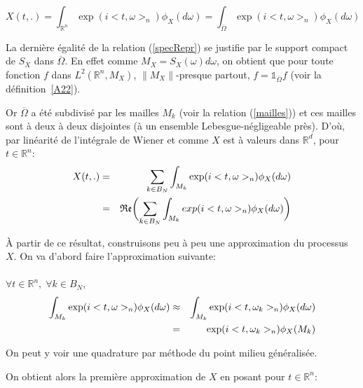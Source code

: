 \begin{equation}
X(t,.) = \displaystyle\int_{\mathbb{R}^n} \exp(i<t,\omega>_{n}) \phi_X(d\omega)= \displaystyle\int_{\overline{\Omega}} \exp(i<t,\omega>_{n}) \phi_X(d\omega) \label{specRepr}
\end{equation}

\begin{remark}
  La dernière égalité de la relation (\ref{specRepr}) se justifie par le support compact de $S_X$ dans $\overline{\Omega}$. En effet comme $M_X = S_X(\omega)d\omega$, on obtient que pour toute fonction $f$ dans $L^2(\mathbb{R}^n, M_X)$, $\|M_X\|$-presque partout, $f = \mathds{1}_{\overline{\Omega}} f$ (voir la définition~\ref{A22}). \\
\end{remark}

Or $\overline{\Omega}$ a été subdivisé par les mailles $M_k$ (voir la relation (\ref{mailles}))  et ces mailles sont à deux à deux disjointes (à un ensemble Lebesgue-négligeable près). D'où,
par linéarité de l'intégrale de Wiener et comme $X$ est à valeurs dans $\mathbb{R}^d$, pour $t \in \mathbb{R}^{n}$:
\begin{eqnarray}
X(t,.) &=& \displaystyle\sum_{k \in B_N} \displaystyle\int_{M_k} \exp(i<t,\omega>_{n}) \phi_X(d\omega) \notag{}\\
  &=& \mathfrak{Re}\biggl(\displaystyle\sum_{k \in B_N} \displaystyle\int_{M_k} exp(i<t,\omega>_{n}) \phi_X(d\omega)\biggr)
\end{eqnarray}

\`A partir de ce résultat, construisons peu à peu une approximation du processus $X$. On va d'abord faire l'approximation suivante:
~\\
\\$\forall t \in \mathbb{R}^{n}, \; \forall k \in B_N$,
\begin{eqnarray}
 \displaystyle\int_{M_k} \exp(i<t,\omega>_{n}) \phi_X(d\omega) &\approx& \displaystyle\int_{M_k} \exp(i<t,\omega_k>_{n}) \phi_X(d\omega) \notag{}\\
  &=& \exp(i<t,\omega_k>_{n}) \phi_X(M_k) 
\end{eqnarray}
\begin{remark}On peut y voir une quadrature par méthode du point milieu généralisée.\\\end{remark}

\noindent On obtient alors la première approximation de $X$ en posant pour $ t \in \mathbb{R}^{n}$: 

